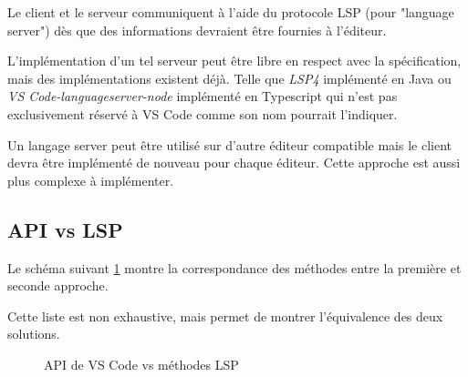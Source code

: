 \documentclass[
    iict, %
    il, %
]{heig-tb}
\begin{document}
\vspace{\parskip}

Le client et le serveur communiquent à l'aide du protocole LSP (pour "language server") dès que des informations devraient être fournies à l'éditeur.

L'implémentation d'un tel serveur peut être libre en respect avec la spécification, mais des implémentations existent déjà. Telle que \emph{LSP4} implémenté en Java ou \emph{VS Code-languageserver-node}
implémenté en Typescript qui n'est pas exclusivement réservé à VS Code comme son nom pourrait l'indiquer.

Un langage server peut être utilisé sur d'autre éditeur compatible mais le client devra être implémenté de nouveau pour chaque éditeur.
Cette approche est aussi plus complexe à implémenter.

\subsection{API vs LSP}\label{api vs lsp}

Le schéma suivant \ref{API de VS Code vs méthodes LSP} montre la correspondance des méthodes entre la première et seconde approche.

Cette liste est non exhaustive, mais permet de montrer l'équivalence des deux solutions.

\begin{figure}[!ht]
    \begin{center}
    \end{center}
    \caption[API de VS Code vs méthodes LSP]{\label{API de VS Code vs méthodes LSP} API de VS Code vs méthodes LSP}
\end{figure}
\end{document}

